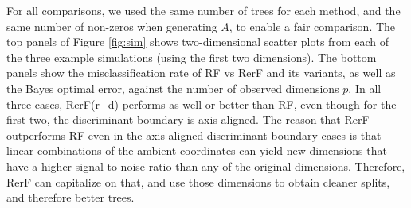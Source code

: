 \documentclass{article} %
\begin{document}
For all comparisons, we used the same number of trees for each method, and the same number of non-zeros when generating $A$, to enable a fair comparison.   The top panels of Figure \ref{fig:sim} shows two-dimensional scatter plots from each of the three example simulations (using the first two dimensions). The bottom panels show the misclassification rate of RF vs RerF and its variants, as well as the Bayes optimal error, against the number of observed dimensions $p$.  In all three cases, RerF(r+d) performs as well or better than RF, even though for the first two, the discriminant boundary is axis aligned.  The reason that RerF outperforms RF even in the axis aligned discriminant boundary cases is that linear combinations of the ambient coordinates can yield new dimensions that have a higher signal to noise ratio than any of the original dimensions.  Therefore, RerF can capitalize on that, and use those dimensions to obtain cleaner splits, and therefore better trees.

\end{document}
